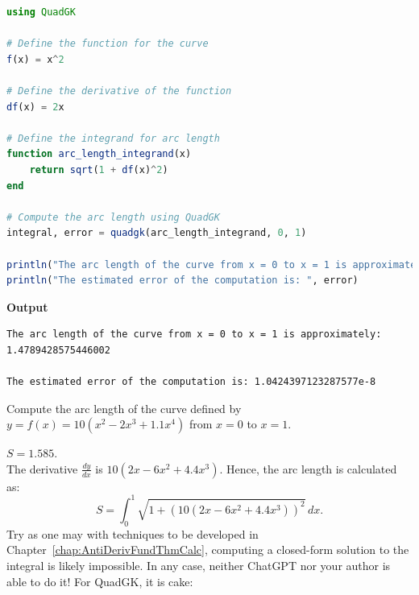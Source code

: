 \begin{lstlisting}[language=Julia,style=mystyle]
using QuadGK

# Define the function for the curve
f(x) = x^2

# Define the derivative of the function
df(x) = 2x

# Define the integrand for arc length
function arc_length_integrand(x)
    return sqrt(1 + df(x)^2)
end

# Compute the arc length using QuadGK
integral, error = quadgk(arc_length_integrand, 0, 1)

println("The arc length of the curve from x = 0 to x = 1 is approximately: ", integral)
println("The estimated error of the computation is: ", error)

\end{lstlisting}
\textbf{Output} 
\begin{verbatim}
The arc length of the curve from x = 0 to x = 1 is approximately: 1.4789428575446002

The estimated error of the computation is: 1.0424397123287577e-8
\end{verbatim}
\Qed

\bigskip


\begin{example}
Compute the arc length of the curve defined by \( y = f(x) = 10(x^2 - 2x^3 + 1.1x^4) \) from \( x=0 \) to \( x=1 \). 
\end{example}

\solution \Ans $S = 1.585$.\\

The derivative \( \frac{dy}{dx} \) is \( 10(2x - 6x^2 + 4.4x^3)
 \). Hence, the arc length is calculated as:
\begin{equation}
S = \int_{0}^{1} \sqrt{1 + \left( 10(2x - 6x^2 + 4.4x^3) \right)^2} \, dx.
\end{equation}
Try as one may with techniques to be developed in Chapter~\ref{chap:AntiDerivFundThmCalc}, computing a closed-form solution to the integral is likely impossible. In any case, neither ChatGPT nor your author is able to do it! For QuadGK, it is cake:

